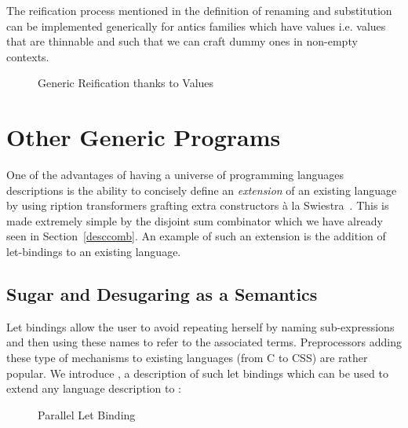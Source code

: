 The reification process mentioned in the definition of renaming
and substitution can be implemented generically for antics
families which have  values i.e. values that are thinnable
and such that we can craft dummy ones in non-empty contexts.

\begin{figure}[h]
\begin{minipage}{0.40\textwidth}
\end{minipage}\hspace{2em}
\begin{minipage}{0.50\textwidth}
\end{minipage}
\caption{Generic Reification thanks to  Values}
\end{figure}




\section{Other Generic Programs}

One of the advantages of having a universe of programming languages
descriptions is the ability to concisely define an \emph{extension}
of an existing language by using ription transformers
grafting extra constructors à la Swiestra~\citeyear{swierstra_2008}.
This is made extremely simple by the
disjoint sum combinator  which we have already seen
in Section~\ref{desccomb}.
An example of such an extension is the addition of let-bindings to
an existing language.

\subsection{Sugar and Desugaring as a Semantics}

Let bindings allow the user to avoid repeating herself by naming
sub-expressions and then using these names to refer to the associated
terms. Preprocessors adding these type of mechanisms to existing
languages (from C to CSS) are rather popular. We introduce ,
a description of such let bindings which can be used to extend any
language description  to   :

\begin{figure}[h]
\caption{Parallel Let Binding}
\end{figure}

